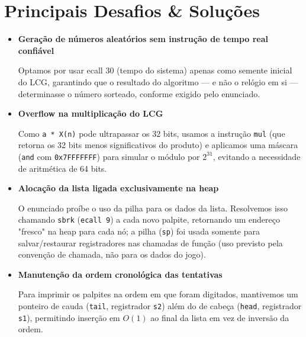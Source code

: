 \documentclass[brazil, a4paper, 11pt]{article}
\begin{document}
    
    
    \section*{Principais Desafios \& Soluções}
    \begin{itemize}
        \item
        \textbf{Geração de números aleatórios sem instrução de tempo real confiável}
        
        Optamos por usar ecall 30 (tempo do sistema) apenas como semente inicial do LCG, garantindo que o resultado do algoritmo — e não o relógio em si — determinasse o número sorteado, conforme exigido pelo enunciado.


        \item
        \textbf{Overflow na multiplicação do LCG}

        Como \verb|a * X(n)| pode ultrapassar os 32 bits, usamos a instrução \verb|mul| (que retorna os 32 bits menos significativos do produto) e aplicamos uma máscara (\verb|and| com \verb|0x7FFFFFFF|) para simular o módulo por $2^{31}$, evitando a necessidade de aritmética de 64 bits.


        \item
        \textbf{Alocação da lista ligada exclusivamente na heap}
        
        O enunciado proíbe o uso da pilha para os dados da lista. Resolvemos isso chamando \verb|sbrk| (\verb|ecall 9|) a cada novo palpite, retornando um endereço "fresco" na heap para cada nó; a pilha (\verb|sp|) foi usada somente para salvar/restaurar registradores nas chamadas de função (uso previsto pela convenção de chamada, não para os dados do jogo).

        \item
        \textbf{Manutenção da ordem cronológica das tentativas}

        Para imprimir os palpites na ordem em que foram digitados, mantivemos um ponteiro de cauda (\verb|tail|, registrador \verb|s2|) além do de cabeça (\verb|head|, registrador \verb|s1|), permitindo inserção em $O(1)$ ao final da lista em vez de inversão da ordem.
    \end{itemize}
\end{document}
